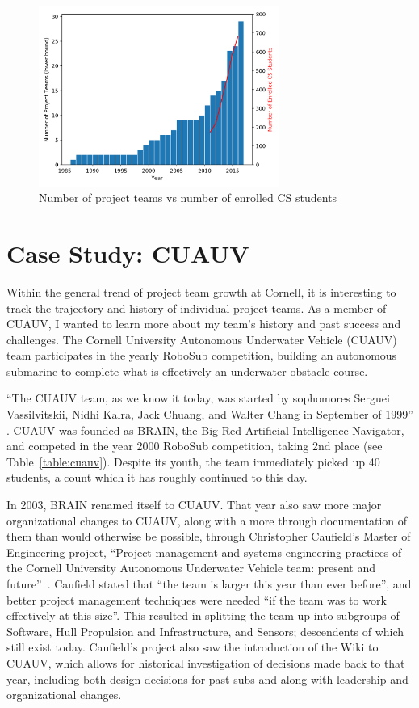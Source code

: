 \documentclass[12pt]{article}
\begin{document}
\begin{figure}
  \center
  \includegraphics[width=0.7\textwidth]{teams-vs-cs}
  \caption{Number of project teams vs number of enrolled CS students~\cite{snabes_computer_2016}}
  \label{fig:teamcount}
\end{figure}


\section{Case Study: CUAUV}
\label{sec:cuauv}

Within the general trend of project team growth at Cornell, it is interesting to track the trajectory and history of individual project teams.
As a member of CUAUV, I wanted to learn more about my team's history and past success and challenges. The Cornell University Autonomous Underwater Vehicle (CUAUV) team participates in the yearly RoboSub competition, building an autonomous submarine to complete what is effectively an underwater obstacle course.


``The CUAUV team, as we know it today, was started by sophomores Serguei Vassilvitskii, Nidhi Kalra, Jack Chuang, and Walter Chang in September of 1999''
\cite{noauthor_cuauv_2003}. CUAUV was founded as BRAIN, the Big Red Artificial Intelligence Navigator, and competed in the year 2000 RoboSub competition, taking 2nd place (see Table~\ref{table:cuauv}).
Despite its youth, the team immediately picked up 40 students, a count which it has roughly continued to this day.

In 2003, BRAIN renamed itself to CUAUV.
That year also saw more major organizational changes to CUAUV, along with a more through documentation of them than would otherwise be possible, through Christopher Caufield's Master of Engineering project, ``Project management and systems engineering practices of the Cornell University Autonomous Underwater Vehicle team: present and future''~\cite{caufield_project_2004}.
Caufield stated that ``the team is larger this year than ever before'', and better project management techniques were needed ``if the team was to work effectively at this size''.
This resulted in splitting the team up into subgroups of Software, Hull Propulsion and Infrastructure, and Sensors; descendents of which still exist today.
Caufield's project also saw the introduction of the Wiki to CUAUV, which allows for historical investigation of decisions made back to that year, including both design decisions for past subs and along with leadership and organizational changes.
\end{document}

